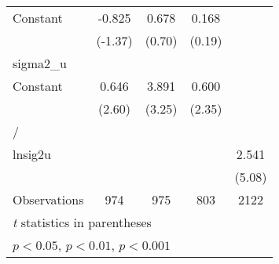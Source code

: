 {\begin{longtable}{l*{4}{c}}
Constant        &   -0.825         &    0.678         &    0.168         &                  \\
                &  (-1.37)         &   (0.70)         &   (0.19)         &                  \\
\hline
sigma2\_u        &                  &                  &                  &                  \\
Constant        &    0.646\sym{**} &    3.891\sym{**} &    0.600\sym{*}  &                  \\
                &   (2.60)         &   (3.25)         &   (2.35)         &                  \\
\hline
/               &                  &                  &                  &                  \\
lnsig2u         &                  &                  &                  &    2.541\sym{***}\\
                &                  &                  &                  &   (5.08)         \\
\hline
Observations    &      974         &      975         &      803         &     2122         \\
\hline\hline
\multicolumn{5}{l}{\footnotesize \textit{t} statistics in parentheses}\\
\multicolumn{5}{l}{\footnotesize \sym{*} \(p<0.05\), \sym{**} \(p<0.01\), \sym{***} \(p<0.001\)}\\
\end{longtable}
}
